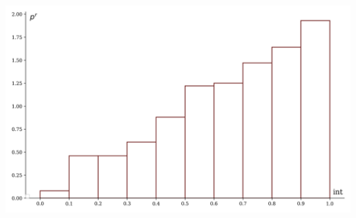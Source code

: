 \documentclass[a4paper, 14pt]{extarticle}
\begin{document}
\begin{minipage}[t]{0.25\textwidth}
\includegraphics[width=\textwidth, height=\textheight, keepaspectratio]{sample16_hist}
\end{minipage}
\end{document}
